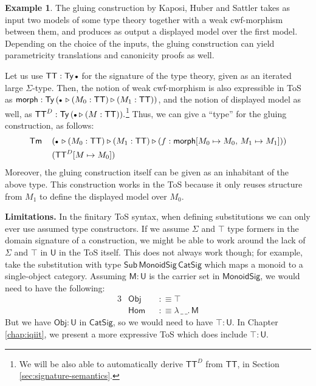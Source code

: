 \documentclass[12pt,a4paper,twoside,openany]{book}
\theoremstyle{remark}
\theoremstyle{definition}
\newtheorem{myexample}{Example}
\theoremstyle{theorem}
\newcommand{\ms}[1]{\mathsf{#1}}
\newcommand{\Sub}{\mathsf{Sub}}
\newcommand{\Tm}{\mathsf{Tm}}
\newcommand{\Ty}{\mathsf{Ty}}
\newcommand{\U}{\mathsf{U}}
\newcommand{\ext}{\triangleright}
\newcommand{\emptycon}{\scaleobj{.75}\bullet}
\newcommand{\Obj}{\ms{Obj}}
\newcommand{\defn}{:\equiv}
\begin{document}
\begin{myexample}
\label{ex:gluing}
The gluing construction by Kaposi, Huber and Sattler \cite{gluing} takes as
input two models of some type theory together with a weak cwf-morphism between
them, and produces as output a displayed model over the first model. Depending
on the choice of the inputs, the gluing construction can yield parametricity
translations and canonicity proofs as well.

Let us use $\ms{TT} : \Ty\,\emptycon$ for the signature of the type theory,
given as an iterated large $\Sigma$-type. Then, the notion of weak cwf-morphism
is also expressible in ToS as $\ms{morph} : \Ty\,(\emptycon\,\ext(M_0 :
\ms{TT})\ext(M_1 : \ms{TT}))$, and the notion of displayed model as well, as
$\ms{TT}^D : \Ty\,(\emptycon\ext(M : \ms{TT})).$\footnote{We will be also able to automatically derive $\ms{TT}^D$ from $\ms{TT}$, in Section \ref{sec:signature-semantics}.} Thus, we can give a ``type''
for the gluing construction, as follows:
\begin{alignat*}{3}
  &\Tm\,&&(\emptycon\,\ext (M_0 : \ms{TT}) \ext (M_1 : \ms{TT}) \ext (f : \ms{morph}[M_0 \mapsto M_0,\,M_1 \mapsto M_1]))\\
  & && (\ms{TT}^D[M \mapsto M_0])
\end{alignat*}
Moreover, the gluing construction itself can be given as an inhabitant of the
above type. This construction works in the ToS because it only reuses structure
from $M_1$ to define the displayed model over $M_0$.
\end{myexample}

\textbf{Limitations.}
In the finitary ToS syntax, when defining substitutions we can only ever use
assumed type constructors. If we assume $\Sigma$ and $\top$ type formers in
the domain signature of a construction, we might be able to work around the lack
of $\Sigma$ and $\top$ in $\U$ in the ToS itself. This does not always work
though; for example, take the substitution with type
$\Sub\,\ms{MonoidSig}\,\ms{CatSig}$ which maps a monoid to a single-object
category. Assuming $\ms{M} : \U$ is the carrier set in $\ms{MonoidSig}$, we
would need to have the following:
\begin{alignat*}{3}
  &\ms{Obj} &&\defn \top \\
  &\ms{Hom} &&\defn \lambda\,\_\,\_.\, \ms{M}
\end{alignat*}
But we have $\Obj : \U$ in $\ms{CatSig}$, so we would need to have $\top : \U$.
In Chapter \ref{chap:iqiit}, we present a more expressive ToS which does include
$\top : \U$.
\end{document}
